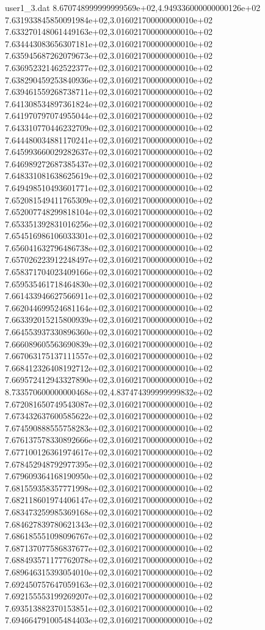 \begin{filecontents}{user1_3.dat}
8.670748999999999569e+02,4.949336000000000126e+02
7.631933845850091984e+02,3.016021700000000010e+02
7.633270148061449163e+02,3.016021700000000010e+02
7.634443083656307181e+02,3.016021700000000010e+02
7.635945687262079673e+02,3.016021700000000010e+02
7.636952321462522377e+02,3.016021700000000010e+02
7.638290459253840936e+02,3.016021700000000010e+02
7.639461559268738711e+02,3.016021700000000010e+02
7.641308534897361824e+02,3.016021700000000010e+02
7.641970797074955044e+02,3.016021700000000010e+02
7.643310770446232709e+02,3.016021700000000010e+02
7.644480034881170241e+02,3.016021700000000010e+02
7.645993660029282637e+02,3.016021700000000010e+02
7.646989272687385437e+02,3.016021700000000010e+02
7.648331081638625619e+02,3.016021700000000010e+02
7.649498510493601771e+02,3.016021700000000010e+02
7.652081549411765309e+02,3.016021700000000010e+02
7.652007748299818104e+02,3.016021700000000010e+02
7.653351392831016256e+02,3.016021700000000010e+02
7.654516986106033301e+02,3.016021700000000010e+02
7.656041632796486738e+02,3.016021700000000010e+02
7.657026223912248497e+02,3.016021700000000010e+02
7.658371704023409166e+02,3.016021700000000010e+02
7.659535461718464830e+02,3.016021700000000010e+02
7.661433946627566911e+02,3.016021700000000010e+02
7.662044699524681164e+02,3.016021700000000010e+02
7.663392015215800939e+02,3.016021700000000010e+02
7.664553937330896360e+02,3.016021700000000010e+02
7.666089605563690839e+02,3.016021700000000010e+02
7.667063175137111557e+02,3.016021700000000010e+02
7.668412326408192712e+02,3.016021700000000010e+02
7.669572412943327890e+02,3.016021700000000010e+02
8.733570600000000468e+02,4.837474399999999832e+02
7.672081650749543087e+02,3.016021700000000010e+02
7.673432637600585622e+02,3.016021700000000010e+02
7.674590888555758283e+02,3.016021700000000010e+02
7.676137578330892666e+02,3.016021700000000010e+02
7.677100126361974617e+02,3.016021700000000010e+02
7.678452948792977395e+02,3.016021700000000010e+02
7.679609364168190950e+02,3.016021700000000010e+02
7.681559358357771998e+02,3.016021700000000010e+02
7.682118601974406147e+02,3.016021700000000010e+02
7.683473259985369168e+02,3.016021700000000010e+02
7.684627839780621343e+02,3.016021700000000010e+02
7.686185551098096767e+02,3.016021700000000010e+02
7.687137077586837677e+02,3.016021700000000010e+02
7.688493571177762078e+02,3.016021700000000010e+02
7.689646315393054010e+02,3.016021700000000010e+02
7.692450757647059163e+02,3.016021700000000010e+02
7.692155553199269207e+02,3.016021700000000010e+02
7.693513882370153851e+02,3.016021700000000010e+02
7.694664791005484403e+02,3.016021700000000010e+02

\end{filecontents}
